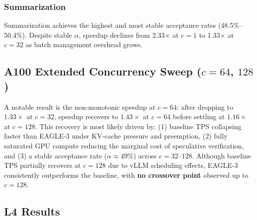 \documentclass[10pt,twocolumn]{article}
\begin{document}
\subsubsection{Summarization}

Summarization achieves the highest and most stable acceptance rates
(48.5\%--50.4\%).  Despite stable $\alpha$, speedup declines from 2.33$\times$ at
$c=1$ to 1.33$\times$ at $c=32$ as batch management overhead grows.

\subsection{A100 Extended Concurrency Sweep ($c=64$, $128$)}
\label{sec:a100_ext}


A notable result is the non-monotonic speedup at $c=64$: after dropping to $1.33\times$ at $c=32$, speedup recovers to $1.43\times$ at $c=64$ before settling at $1.16\times$ at $c=128$. This recovery is most likely driven by: (1) baseline TPS collapsing faster than EAGLE-3 under KV-cache pressure and preemption, (2) fully saturated GPU compute reducing the marginal cost of speculative verification, and (3) a stable acceptance rate ($\alpha \approx 49\%$) across $c=32$--$128$. Although baseline TPS partially recovers at $c=128$ due to vLLM scheduling effects, EAGLE-3 consistently outperforms the baseline, with \textbf{no crossover point} observed up to $c=128$.

\subsection{L4 Results}
\end{document}
